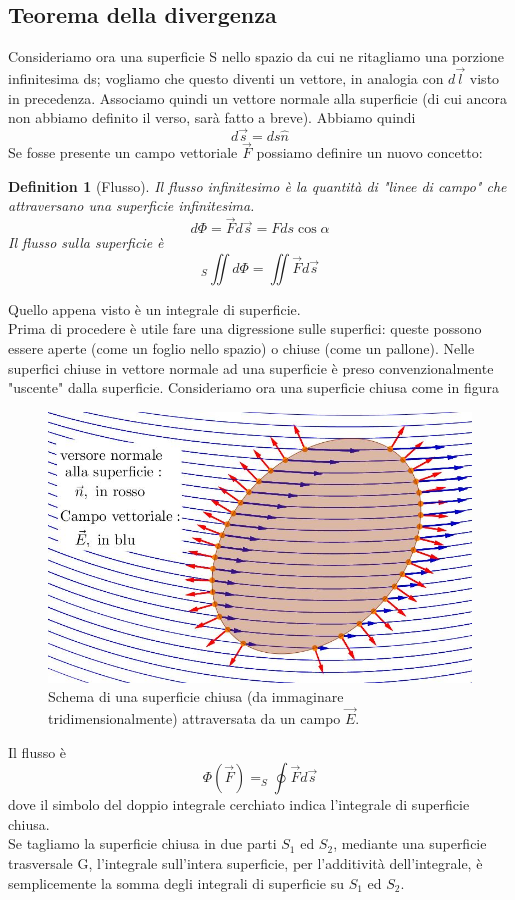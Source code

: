\documentclass[10pt,a4paper]{article}
\newtheorem{definition}{Definition}
\begin{document}
\subsection{Teorema della divergenza}\label{ap:thm_divergenza}
Consideriamo ora una superficie S nello spazio da cui ne ritagliamo una porzione infinitesima ds; vogliamo che questo diventi un vettore, in analogia con $d\vec{l}$ visto in precedenza. Associamo quindi un vettore normale alla superficie (di cui ancora non abbiamo definito il verso, sarà fatto a breve). Abbiamo quindi
\[d\vec{s} = ds \hat{n}\]
Se fosse presente un campo vettoriale $\vec{F}$ possiamo definire un nuovo concetto:
\begin{definition}[Flusso]
	Il flusso infinitesimo è la quantità di "linee di campo" che attraversano una superficie infinitesima. 
	\[d\Phi = \vec{F}d\vec{s} = Fds\cos\alpha\]
	Il flusso sulla superficie è 
	\[_S\iint d\Phi = \iint \vec{F}d\vec{s}\]
\end{definition}
Quello appena visto è un integrale di superficie.\\
Prima di procedere è utile fare una digressione sulle superfici: queste possono essere aperte (come un foglio nello spazio) o chiuse (come un pallone). Nelle superfici chiuse in vettore normale ad una superficie è preso convenzionalmente "uscente" dalla superficie. Consideriamo ora una superficie chiusa come in figura
\begin{figure}[h!]
	\centering
	\includegraphics[width=0.6\linewidth]{images/flusso2bis}
	\caption{Schema di una superficie chiusa (da immaginare tridimensionalmente) attraversata da un campo \(\vec{E}\).}
	\label{fig:flusso2bis}
\end{figure}
\FloatBarrier
Il flusso è 
\[\Phi(\vec{F}) = _S\oint \vec{F}d\vec{s}\]
dove il simbolo del doppio integrale cerchiato indica l'integrale di superficie chiusa.\\
Se tagliamo la superficie chiusa in due parti \(S_1\) ed \(S_2\), mediante una superficie trasversale G, l'integrale sull'intera superficie, per l'additività dell'integrale, è semplicemente la somma degli integrali di superficie su \(S_1\) ed \(S_2\).
\end{document}
